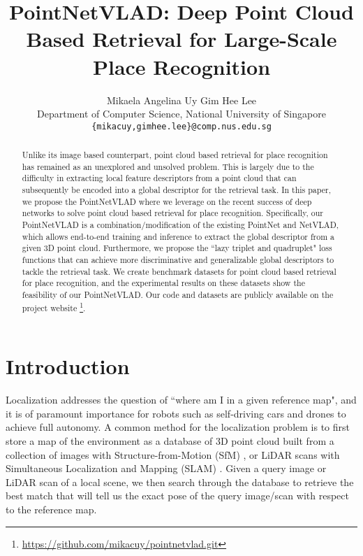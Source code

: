 \documentclass[10pt,twocolumn,letterpaper]{article}
\begin{document}
	
\title{PointNetVLAD: Deep Point Cloud Based Retrieval for Large-Scale Place Recognition}
	
	\author{Mikaela Angelina Uy
\quad
		Gim Hee Lee\\
		Department of Computer Science, National University of Singapore\\
		{\tt\small \{mikacuy,gimhee.lee\}@comp.nus.edu.sg}
	}
	
	\maketitle


\begin{abstract}
		\vspace{-0.3cm}
		Unlike its image based counterpart, point cloud based retrieval for place recognition has remained as an unexplored and unsolved problem. This is largely due to the difficulty in extracting local feature descriptors from a point cloud that can  subsequently be encoded into a global descriptor for the retrieval task. In this paper, we propose the PointNetVLAD where we leverage on the recent success of deep networks to solve point cloud based retrieval for place recognition. Specifically, our PointNetVLAD is a combination/modification of the existing PointNet and NetVLAD, which allows end-to-end training and inference to extract the global descriptor from a given 3D point cloud.
		Furthermore, we propose the ``lazy triplet and quadruplet" loss functions that can achieve more discriminative and generalizable global descriptors to tackle the retrieval task.
		We create benchmark datasets for point cloud based retrieval for place recognition, and the experimental results on these datasets show the feasibility of our PointNetVLAD. 
		Our code and datasets are publicly available on the project website \footnote{\url{https://github.com/mikacuy/pointnetvlad.git}}.
	\end{abstract}
	
\vspace{-0.5cm}
\section{Introduction}
\vspace{-0.1cm}
Localization addresses the question of ``where am I in a given reference map", and it is of paramount importance for robots such as self-driving cars \cite{Christian2017} and drones \cite{Fraundorfer2012} to achieve full autonomy. 
A common method for the localization problem is to first store a map of the environment as a database of 3D point cloud built from a collection of images with Structure-from-Motion (SfM) \cite{Hartley2004}, or LiDAR scans with Simultaneous Localization and Mapping (SLAM) \cite{Thrun:2005}. Given a query image or LiDAR scan of a local scene, we then search through the database to retrieve the best match that will tell us the exact pose of the query image/scan with respect to the reference map. 
\end{document}

